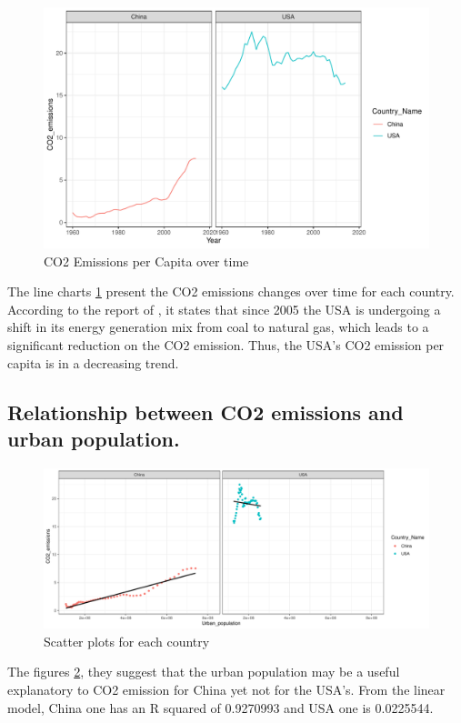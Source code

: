 \documentclass[11pt,a4paper,]{article}
\begin{document}
\begin{figure}

{\centering \includegraphics[width=0.5\linewidth]{Figures/figure1-1} 

}

\caption{CO2 Emissions per Capita over time}\label{fig:figure1}
\end{figure}

The line charts \ref{fig:figure1} present the CO2 emissions changes over time for each country. According to the report of \textcite{SUEWING20075267}, it states that since 2005 the USA is undergoing a shift in its energy generation mix from coal to natural gas, which leads to a significant reduction on the CO2 emission. Thus, the USA's CO2 emission per capita is in a decreasing trend.

\hypertarget{relationship-between-co2-emissions-and-urban-population.}{%
\subsection{Relationship between CO2 emissions and urban population.}\label{relationship-between-co2-emissions-and-urban-population.}}

\begin{figure}

{\centering \includegraphics[width=0.8\linewidth]{Figures/scatterplot-1} 

}

\caption{Scatter plots for each country}\label{fig:scatterplot}
\end{figure}

The figures \ref{fig:scatterplot}, they suggest that the urban population may be a useful explanatory to CO2 emission for China yet not for the USA's. From the linear model, China one has an R squared of 0.9270993 and USA one is 0.0225544.
\end{document}
